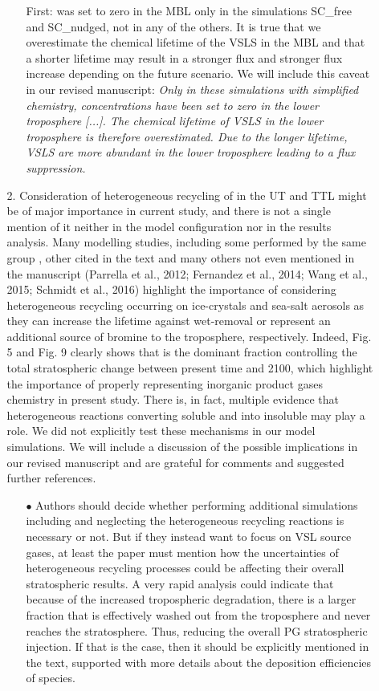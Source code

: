\begin{itemize}
\begin{itemize}
\begin{itemize}
    First:  was set to zero in the MBL only in the simulations SC\_free and SC\_nudged, not in any of the others. It is true that we overestimate the chemical lifetime of the VSLS in the MBL and that a shorter lifetime may result in a stronger flux and stronger flux increase depending on the future scenario. We will include this caveat in our revised manuscript: \emph{Only in these simulations with simplified chemistry,  concentrations have been set to zero in the lower troposphere [...]. The chemical lifetime of VSLS in the lower troposphere is therefore overestimated. Due to the longer lifetime, VSLS are more abundant in the lower troposphere leading to a flux suppression.}
  \end{itemize}
\item[2.]{\color{blue}Consideration of heterogeneous recycling of  in the UT and TTL might be of major importance in current study, and there is not a single mention of it neither in the model configuration nor in the results analysis. Many modelling studies, including some performed by the same group \citep{ACP:Aschmann2009}, other cited in the text \citep{ACP:Liang2014} and many others not even mentioned in the manuscript (Parrella et al., 2012; Fernandez et al., 2014; Wang et al., 2015; Schmidt et al., 2016) highlight the importance of considering heterogeneous recycling occurring on ice-crystals and sea-salt aerosols as they can increase the lifetime against wet-removal or represent an additional source of bromine to the troposphere, respectively. Indeed, Fig. 5 and Fig. 9 clearly shows that  is the dominant fraction controlling the total stratospheric  change between present time and 2100, which highlight the importance of properly representing inorganic product gases chemistry in present study.}
  There is, in fact, multiple evidence that heterogeneous reactions converting soluble  and  into insoluble  may play a role. We did not explicitly test these mechanisms in our model simulations. We will include a discussion of the possible implications in our revised manuscript and are grateful for comments and suggested further references.
  \begin{itemize}
  \item[$\bullet$]{\color{blue}Authors should decide whether performing additional simulations including and neglecting the heterogeneous recycling reactions is necessary or not. But if they instead want to focus on VSL source gases, at least the paper must mention how the uncertainties of heterogeneous recycling processes could be affecting their overall stratospheric results. A very rapid analysis could indicate that because of the increased tropospheric degradation, there is a larger  fraction that is effectively washed out from the troposphere and never reaches the stratosphere. Thus, reducing the overall PG stratospheric injection. If that is the case, then it should be explicitly mentioned in the text, supported with more details about the deposition efficiencies of  species.}

\end{itemize}
\end{itemize}
\end{itemize}
